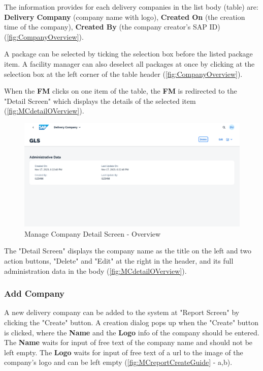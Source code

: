 The information provides for each delivery companies in the list body (table) are: \textbf{Delivery Company} (company name with logo), \textbf{Created On} (the creation time of the company), \textbf{Created By} (the company creator's SAP ID) (\autoref{fig:CompanyOverview}). 

A package can be selected by ticking the selection box before the listed package item. A facility manager can also deselect all packages at once by clicking at the selection box at the left corner of the table header (\autoref{fig:CompanyOverview}). 

\bigskip

When the \textbf{FM} clicks on one item of the table, the \textbf{FM} is redirected to the "Detail Screen" which displays the details of the selected item (\autoref{fig:MCdetailOVerview}). 

\begin{figure}[H]
	\centering
	\includegraphics[width=1\linewidth]{images/user_doc/company/detail/DetailOverview.png}
	\caption{Manage Company Detail Screen - Overview}
	\label{fig:MCdetailOVerview}
\end{figure}

The "Detail Screen" displays the company name as the title on the left and two action buttons, "Delete" and "Edit" at the right in the header, and its full administration data in the body (\autoref{fig:MCdetailOVerview}). 

\subsubsection{Add Company}

A new delivery company can be added to the system at "Report Screen" by clicking the "Create" button. 
A creation dialog pops up when the "Create" button is clicked, where the \textbf{Name} and the \textbf{Logo} info of the company should be entered. The \textbf{Name} waits for input of free text of the company name and should not be left empty. The \textbf{Logo} waits for input of free text of a url to the image of the company's logo and can be left empty (\autoref{fig:MCreportCreateGuide} - a,b). 

